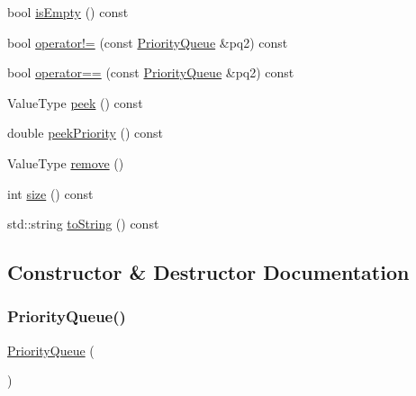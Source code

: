\begin{DoxyCompactItemize}
$$\item 
bool \mbox{\hyperlink{classPriorityQueue_acf82f9b2937375c7b1cf3dccb3df3312}{is\+Empty}} () const
\item 
bool \mbox{\hyperlink{classPriorityQueue_ae558f5c7424d82899a0872c8703e2445}{operator!=}} (const \mbox{\hyperlink{classPriorityQueue}{Priority\+Queue}} \&pq2) const
\item 
bool \mbox{\hyperlink{classPriorityQueue_ab32c20704a0dbe581c0a666156fa057a}{operator==}} (const \mbox{\hyperlink{classPriorityQueue}{Priority\+Queue}} \&pq2) const
\item 
Value\+Type \mbox{\hyperlink{classPriorityQueue_a7fcf31135d35acfa8ab1174c44bf28f3}{peek}} () const
\item 
double \mbox{\hyperlink{classPriorityQueue_ad3fce2f9d785c3232def3482817ec1c6}{peek\+Priority}} () const
\item 
Value\+Type \mbox{\hyperlink{classPriorityQueue_a025ec97fa5b04552f5ad0902c1f02ac1}{remove}} ()
\item 
int \mbox{\hyperlink{classPriorityQueue_af9593d4a5ff4274efaf429cb4f9e57cc}{size}} () const
\item 
std\+::string \mbox{\hyperlink{classPriorityQueue_a1fe5121d6528fdea3f243321b3fa3a49}{to\+String}} () const
\end{DoxyCompactItemize}


\subsection{Constructor \& Destructor Documentation}
\mbox{\label{classPriorityQueue_a6930969dba58cbd2b3326bb2b69a86bb}} 
\subsubsection{\texorpdfstring{Priority\+Queue()}{PriorityQueue()}\hspace{0.1cm}{\footnotesize\ttfamily [1/2]}}
{\footnotesize\ttfamily \mbox{\hyperlink{classPriorityQueue}{Priority\+Queue}} (\begin{DoxyParamCaption}{ }\end{DoxyParamCaption})\hspace{0.3cm}{\ttfamily [default]}}

\mbox{\label{classPriorityQueue_a0959caf22cf508b3ffbe726d5bc701d1}} 
